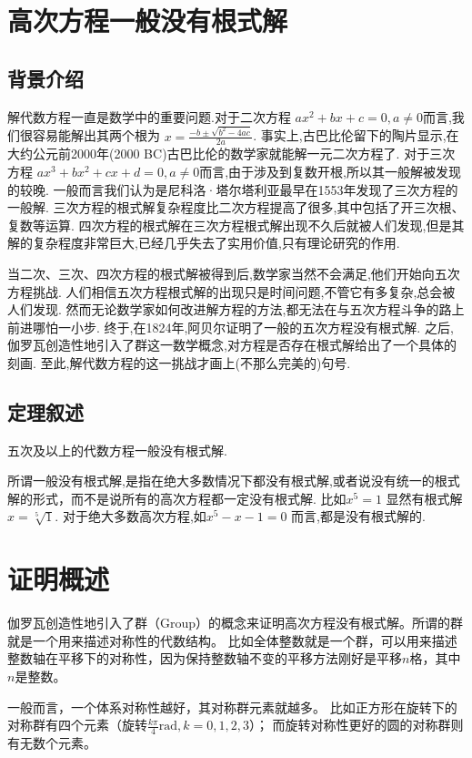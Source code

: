 \documentclass[main]{subfiles}
\begin{document}
\renewcommand{\filename}{No.9Theorem}%
\section{高次方程一般没有根式解}
\subsection{背景介绍}
解代数方程一直是数学中的重要问题.对于二次方程 \(ax^2+bx+c=0,a \neq 0\)而言,我们很容易能解出其两个根为 \(x= \frac{-b \pm \sqrt{b^2-4ac}}{2a}\).
事实上,古巴比伦留下的陶片显示,在大约公元前2000年(2000 BC)古巴比伦的数学家就能解一元二次方程了.
对于三次方程 \(ax^3+bx^2+cx+d=0,a \neq 0\)而言,由于涉及到复数开根,所以其一般解被发现的较晚.
一般而言我们认为是尼科洛·塔尔塔利亚最早在1553年发现了三次方程的一般解.
三次方程的根式解复杂程度比二次方程提高了很多,其中包括了开三次根、复数等运算.
四次方程的根式解在三次方程根式解出现不久后就被人们发现,但是其解的复杂程度非常巨大,已经几乎失去了实用价值,只有理论研究的作用.

当二次、三次、四次方程的根式解被得到后,数学家当然不会满足,他们开始向五次方程挑战.
人们相信五次方程根式解的出现只是时间问题,不管它有多复杂,总会被人们发现.
然而无论数学家如何改进解方程的方法,都无法在与五次方程斗争的路上前进哪怕一小步.
终于,在1824年,阿贝尔证明了一般的五次方程没有根式解.
之后,伽罗瓦创造性地引入了群这一数学概念,对方程是否存在根式解给出了一个具体的刻画.
至此,解代数方程的这一挑战才画上(不那么完美的)句号.
\subsection{定理叙述}
\begin{theorem}\label{the:1}
  五次及以上的代数方程一般没有根式解.
\end{theorem}
所谓一般没有根式解,是指在绝大多数情况下都没有根式解,或者说没有统一的根式解的形式，而不是说所有的高次方程都一定没有根式解.
比如\(x^5=1\) 显然有根式解\(x=\sqrt[5]{1}\).
对于绝大多数高次方程,如\(x^5-x-1=0\) 而言,都是没有根式解的.
\section{证明概述}
伽罗瓦创造性地引入了群（Group）的概念来证明高次方程没有根式解。所谓的群就是一个用来描述对称性的代数结构。
比如全体整数就是一个群，可以用来描述整数轴在平移下的对称性，因为保持整数轴不变的平移方法刚好是平移\(n\)格，其中\(n\)是整数。

一般而言，一个体系对称性越好，其对称群元素就越多。
比如正方形在旋转下的对称群有四个元素（旋转\(\frac{k \pi}{4} \mathrm{rad},k=0,1,2,3\)）；
而旋转对称性更好的圆的对称群则有无数个元素。
\end{document}
